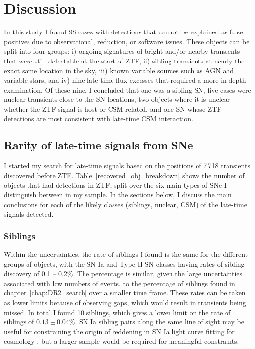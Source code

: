 \documentclass[a4paper,oneside,12pt, class=Latex/Classes/PhDthesisPSnPDF, crop=false]{standalone}
\begin{document}
\section{Discussion}
\label{Pre-ZTF_discussion}
In this study I found 98 cases with detections that cannot be explained as false positives due to observational, reduction, or software issues. These objects can be split into four groups: i) ongoing signatures of bright and/or nearby transients that were still detectable at the start of ZTF, ii) sibling transients at nearly the exact same location in the sky, iii) known variable sources such as AGN and variable stars, and iv) nine late-time flux excesses that required a more in-depth examination. Of these nine, I concluded that one was a sibling SN, five cases were nuclear transients close to the SN locations, two objects where it is unclear whether the ZTF signal is host or CSM-related, and one SN whose ZTF-detections are most consistent with late-time CSM interaction.


\subsection{Rarity of late-time signals from SNe}
I started my search for late-time signals based on the positions of 7\,718 transients discovered before ZTF. Table~\ref{recovered_obj_breakdown} shows the number of objects that had detections in ZTF, split over the six main types of SNe I distinguish between in my sample. In the sections below, I discuss the main conclusions for each of the likely classes (siblings, nuclear, CSM) of the late-time signals detected.


\subsubsection{Siblings}
Within the uncertainties, the rate of siblings I found is the same for the different groups of objects, with the SN Ia and Type II SN classes having rates of sibling discovery of 0.1 -- 0.2\%. The percentage is similar, given the large uncertainties associated with low numbers of events, to the percentage of siblings found in chapter~\ref{chap:DR2_search} over a smaller time frame. These rates can be taken as lower limits because of observing gaps, which would result in transients being missed. In total I found 10 siblings, which gives a lower limit on the rate of siblings of $0.13\pm0.04\%$. SN Ia sibling pairs along the same line of sight may be useful for constraining the origin of reddening in SN Ia light curve fitting for cosmology \citep{DR2_siblings}, but a larger sample would be required for meaningful constraints.
\end{document}
